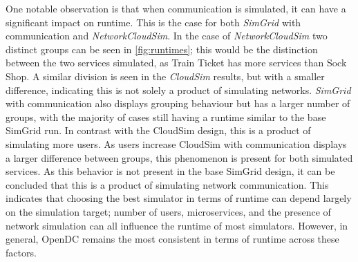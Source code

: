One notable observation is that when communication is simulated, it can have a significant impact on runtime. This is the case for both \textit{SimGrid} with communication and \textit{NetworkCloudSim}. In the case of \textit{NetworkCloudSim} two distinct groups can be seen in \autoref{fig:runtimes}; this would be the distinction between the two services simulated, as Train Ticket has more services than Sock Shop. A similar division is seen in the \textit{CloudSim} results, but with a smaller difference, indicating this is not solely a product of simulating networks. \textit{SimGrid} with communication also displays grouping behaviour but has a larger number of groups, with the majority of cases still having a runtime similar to the base SimGrid run. In contrast with the CloudSim design, this is a product of simulating more users. As users increase CloudSim with communication displays a larger difference between groups, this phenomenon is present for both simulated services. As this behavior is not present in the base SimGrid design, it can be concluded that this is a product of simulating network communication. This indicates that choosing the best simulator in terms of runtime can depend largely on the simulation target; number of users, microservices, and the presence of network simulation can all influence the runtime of most simulators. However, in general, OpenDC remains the most consistent in terms of runtime across these factors.


